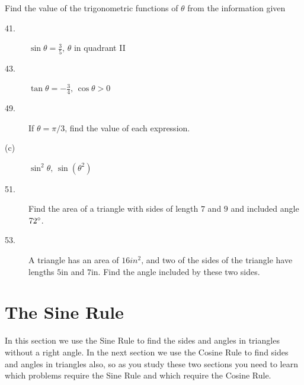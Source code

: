 Find the value of the trigonometric functions of $\theta $ from the information given 


\begin{description}
\item [41.] $\sin  \theta  =\frac{3}{5}\text{,}$ $\theta $ in quadrant II 

\item [43.]
$\tan  \theta  = -\frac{3}{4}\text{,}$ $\cos  \theta  >0$ 

\item [49.] If $\theta  =\pi /3\text{,}$ find the value of each expression. 


\columnsep =30pt
 

\item [(c)]
$\sin ^{2} \theta \text{,}$ $\sin  \left (\theta ^{2}\right )$ 

\item [51.] Find the area of a triangle
with sides of length $7$ and $9$ and included angle $72 \mbox{{\ensuremath{{}^\circ}}}$. 

\item [53.]
A triangle has an area of $16 in^{2}\text{,}$ and two of the sides of the triangle have lengths $5 \mbox{in}$ and $7 \mbox{in}$. Find the angle included by these two sides. \end{description}

\section{The Sine Rule}

In this section we use the Sine Rule to find the sides and angles in triangles without a right angle. In the next section we use the Cosine Rule to find sides and angles in triangles also, so as you study these
two sections you need to learn which problems require the Sine Rule and which require the Cosine Rule. 

